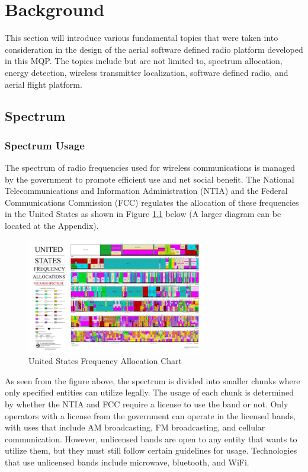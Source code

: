\chapter{Background}
This section will introduce various fundamental topics that were taken into consideration in the design of the aerial software defined radio platform developed in this MQP. The topics include but are not limited to, spectrum allocation, energy detection, wireless transmitter localization, software defined radio, and aerial flight platform.

\section{Spectrum}
\subsection{Spectrum Usage}
The spectrum of radio frequencies used for wireless communications is managed by the government to promote efficient use and net social benefit. The National Telecommunications and Information Administration (NTIA) and the Federal Communications Commission (FCC) regulates the allocation of these frequencies in the United States as shown in Figure \ref{fig:freq_chart} below (A larger diagram can be located at the Appendix).
\begin{figure}[ht]
\centering
\includegraphics[width=0.70\textwidth]{img/the_radio_spectrum.jpg}
\caption{United States Frequency Allocation Chart}
\label{fig:freq_chart}
\end{figure}
As seen from the figure above, the spectrum is divided into smaller chunks where only specified entities can utilize legally. The usage of each chunk is determined by whether the NTIA and FCC require a license to use the band or not. Only operators with a license from the government can operate in the licensed bands, with uses that include AM broadcasting, FM broadcasting, and cellular communication. However, unlicensed bands are open to any entity that wants to utilize them, but they must still follow certain guidelines for usage. Technologies that use unlicensed bands include microwave, bluetooth, and WiFi.

